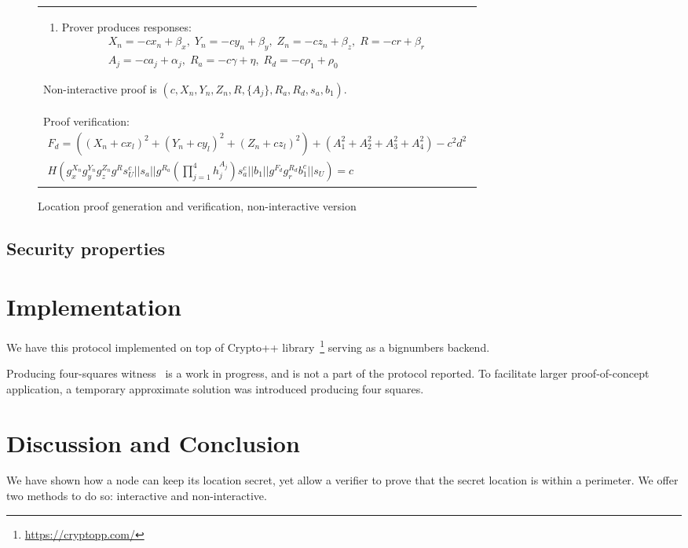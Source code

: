 \documentclass{article}
\begin{document}
\begin{figure}[!htb]
\begin{tabular}{|p{\linewidth}|}
\begin{enumerate}
\item
  Prover produces responses:
\begin{multline}
  X_n = -c x_n + \beta_x,  \;
  Y_n = -c y_n + \beta_y,  \;
  Z_n = -c z_n + \beta_z,   \;
  R = -c r + \beta_r   \\
  A_j = -c a_j + \alpha_j, \;
  R_a = -c \gamma + \eta,   \;
  R_d = -c \rho_1 + \rho_0
\end{multline}
\end{enumerate}
Non-interactive proof is
$(c, X_n, Y_n, Z_n, R, \{A_j\}, R_a, R_d, s_a, b_1)$.
\\
Proof verification:
\begin{multline}
\label{verf-chash}
  F_d = ((X_n + c x_l)^2 + (Y_n + c y_l)^2 + (Z_n + c z_l)^2) + (A_1^2 + A_2^2 + A_3^2 + A_4^2) - c^2 d^2 \\
  H(g_x^{X_n} g_y^{Y_n} g_z^{Z_n} g^{R} s_U^{c} ||
    s_a ||
    g^{R_a} (\prod_{j=1}^4 h_j^{A_j}) s_a^{c} ||
    b_1 ||
    g^{F_d} g_r^{R_d} b_1^c ||
    s_U)
  = c
\end{multline}
\\
\hline
\end{tabular}
\caption{Location proof generation and verification, non-interactive version}
\label{ni_fig}
\end{figure}

\subsection{Security properties}


\section{Implementation}

We have this protocol implemented on top of {Crypto++} library~\footnote{\url{https://cryptopp.com/}}
serving as a bignumbers backend.

Producing four-squares witness~\cite{PollackTrevino} is a work in progress, and is not a part of the protocol reported.
To facilitate larger proof-of-concept application, a temporary approximate solution was introduced producing four squares.

\cite{Idemix}

\section{Discussion and Conclusion}

We have shown how a node can keep its location secret, yet allow a verifier to prove that the secret location is within a perimeter.
We offer two methods to do so: interactive and non-interactive.


% 


\end{document}
